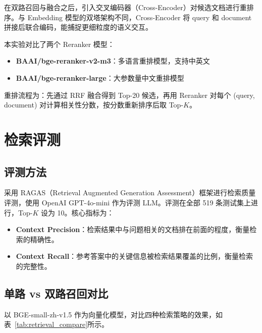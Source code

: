 \documentclass[12pt, a4paper]{article}
\begin{document}
在双路召回与融合之后，引入交叉编码器（Cross-Encoder）对候选文档进行重排序。与 Embedding 模型的双塔架构不同，Cross-Encoder 将 query 和 document 拼接后联合编码，能捕捉更细粒度的语义交互。

本实验对比了两个 Reranker 模型：
\begin{itemize}[leftmargin=2em]
    \item \textbf{BAAI/bge-reranker-v2-m3}：多语言重排模型，支持中英文
    \item \textbf{BAAI/bge-reranker-large}：大参数量中文重排模型
\end{itemize}

重排流程为：先通过 RRF 融合得到 Top-20 候选，再用 Reranker 对每个 (query, document) 对计算相关性分数，按分数重新排序后取 Top-$K$。

\section{检索评测}

\subsection{评测方法}

采用 RAGAS（Retrieval Augmented Generation Assessment）框架进行检索质量评测，使用 OpenAI GPT-4o-mini 作为评测 LLM。评测在全部 519 条测试集上进行，Top-$K$ 设为 10。核心指标为：

\begin{itemize}[leftmargin=2em]
    \item \textbf{Context Precision}：检索结果中与问题相关的文档排在前面的程度，衡量检索的精确性。
    \item \textbf{Context Recall}：参考答案中的关键信息被检索结果覆盖的比例，衡量检索的完整性。
\end{itemize}

\subsection{单路 vs 双路召回对比}

以 BGE-small-zh-v1.5 作为向量化模型，对比四种检索策略的效果，如表~\ref{tab:retrieval_compare}所示。
\end{document}
